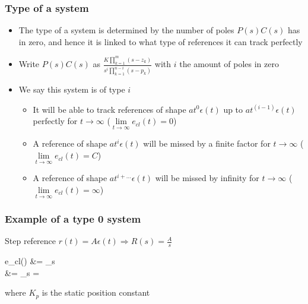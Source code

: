 \begin{frame}
	\frametitle{Type of a system}
	\begin{block}{}
		\begin{itemize}
			\item The type of a system is determined by the number of poles $P(s)C(s)$ has in zero, and hence it is linked to what type of references it can track perfectly
			\item Write $P(s)C(s)$ as $\frac{K \prod_{k=1}^{m} (s-z_k)}{s^i \prod_{k=1}^{n-i} (s-p_k)}$ with $i$ the amount of poles in zero
			\item We say this system is of type $i$
			\begin{itemize}
				\item It will be able to track references of shape $at^0 \epsilon(t)$ up to $at^{(i - 1)} \epsilon(t)$ perfectly for $t\rightarrow \infty$ ($\lim\limits_{t \rightarrow \infty} e_{cl}(t) = 0$)
				\item A reference of shape $at^i \epsilon(t)$ will be missed by a finite factor for $t\rightarrow \infty$ ($\lim\limits_{t \rightarrow \infty} e_{cl}(t) = C$)
				\item A reference of shape $at^{i+...} \epsilon(t)$ will be missed by infinity for $t\rightarrow \infty$ ($\lim\limits_{t \rightarrow \infty} e_{cl}(t) = \infty$)
			\end{itemize}
		\end{itemize}
	\end{block}
\end{frame}

\begin{frame}
	\frametitle{Example of a type 0 system}
		\begin{example}
			{Step reference $r(t) = A \epsilon (t) \Rightarrow R(s) = \frac{A}{s}$}
			\begin{flalign*}
				e_{cl}(\infty) &= \lim\limits_{s }   \\
				&= \lim\limits_{s } 
				= 
			\end{flalign*}
			where $K_p$ is the static position constant
		\end{example}
\end{frame}

